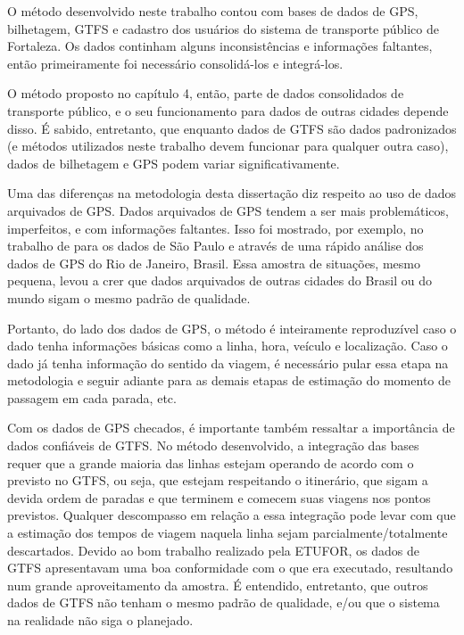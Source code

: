 \documentclass[        
    a4paper,          %
    12pt,             %
    chapter=TITLE,    %
    section=Title,    %
    subsection=Title, %
    oneside,          %
    english,          %
    spanish,          %
    brazil,           %
    fleqn             %
]{abntex2}
\begin{document}
  O método desenvolvido neste trabalho contou com bases de dados de GPS, bilhetagem, GTFS e cadastro dos usuários do sistema de transporte público de Fortaleza. Os dados continham alguns inconsistências e informações faltantes, então primeiramente foi necessário consolidá-los e integrá-los.
  
  O método proposto no capítulo 4, então, parte de dados consolidados de transporte público, e o seu funcionamento para dados de outras cidades depende disso. É sabido, entretanto, que enquanto dados de GTFS são dados padronizados (e métodos utilizados neste trabalho devem funcionar para qualquer outra caso), dados de bilhetagem e GPS podem variar significativamente.
  
  Uma das diferenças na metodologia desta dissertação diz respeito ao uso de dados arquivados de GPS. Dados arquivados de GPS tendem a ser mais problemáticos, imperfeitos, e com informações faltantes. Isso foi mostrado, por exemplo, no trabalho de \citet{Arbex2016} para os dados de São Paulo e através de uma rápido análise dos dados de GPS do Rio de Janeiro, Brasil. Essa amostra de situações, mesmo pequena, levou a crer que dados arquivados de outras cidades do Brasil ou do mundo sigam o mesmo padrão de qualidade.
  
  Portanto, do lado dos dados de GPS, o método é inteiramente reproduzível caso o dado tenha informações básicas como a linha, hora, veículo e localização. Caso o dado já tenha informação do sentido da viagem, é necessário pular essa etapa na metodologia e seguir adiante para as demais etapas de estimação do momento de passagem em cada parada, etc.
  
  Com os dados de GPS checados, é importante também ressaltar a importância de dados confiáveis de GTFS. No método desenvolvido, a integração das bases requer que a grande maioria das linhas estejam operando de acordo com o previsto no GTFS, ou seja, que estejam respeitando o itinerário, que sigam a devida ordem de paradas e que terminem e comecem suas viagens nos pontos previstos. Qualquer descompasso em relação a essa integração pode levar com que a estimação dos tempos de viagem naquela linha sejam parcialmente/totalmente descartados. Devido ao bom trabalho realizado pela ETUFOR, os dados de GTFS apresentavam uma boa conformidade com o que era executado, resultando num grande aproveitamento da amostra. É entendido, entretanto, que outros dados de GTFS não tenham o mesmo padrão de qualidade, e/ou que o sistema na realidade não siga o planejado.
  
\end{document}
